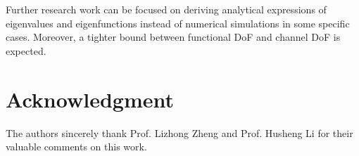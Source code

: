\documentclass[12pt,draftclsnofoot,journal,onecolumn]{IEEEtran}
\begin{document}
Further research work can be focused on deriving analytical expressions of eigenvalues and eigenfunctions instead of numerical simulations in some specific cases. Moreover, a tighter bound between functional DoF and channel DoF is expected.

\section*{Acknowledgment}

The authors sincerely thank Prof. Lizhong Zheng and Prof. Husheng Li for their valuable comments on this work.

	
	\footnotesize
	
	
	
	
\end{document}

